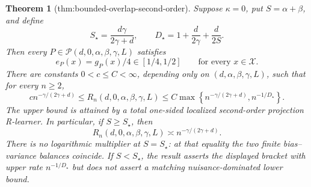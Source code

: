 \documentclass{article}
\newtheorem{theorem}{Theorem}
\begin{document}
\begin{theorem}[thm:bounded-overlap-second-order]\label{thm:bounded-overlap-second-order}
Suppose \(\kappa=0\), put \(S=\alpha+\beta\), and define
\[
 S_\star=\frac{d\gamma}{2\gamma+d},
 \qquad
 D_\star=1+\frac d{2\gamma}+\frac d{2S}.
\]
Then every \(P\in\mathcal P(d,0,\alpha,\beta,\gamma,L)\) satisfies
\[
 e_P(x)=g_P(x)/4\in[1/4,1/2]
 \qquad\text{for every }x\in\mathcal X.
\]
There are constants \(0<c\leq C<\infty\), depending only on \((d,\alpha,\beta,\gamma,L)\), such that for every \(n\geq2\),
\[
 c n^{-\gamma/(2\gamma+d)}
 \leq R_n(d,0,\alpha,\beta,\gamma,L)
 \leq C\max\left\{n^{-\gamma/(2\gamma+d)},
 n^{-1/D_\star}\right\}.
\]
The upper bound is attained by a total one-sided localized second-order projection R-learner.  In particular, if \(S\geq S_\star\), then
\[
 R_n(d,0,\alpha,\beta,\gamma,L)
 \asymp n^{-\gamma/(2\gamma+d)}.
\]
There is no logarithmic multiplier at \(S=S_\star\): at that equality the two finite bias--variance balances coincide.  If \(S<S_\star\), the result asserts the displayed bracket with upper rate \(n^{-1/D_\star}\) but does not assert a matching nuisance-dominated lower bound.
\end{theorem}
\end{document}
